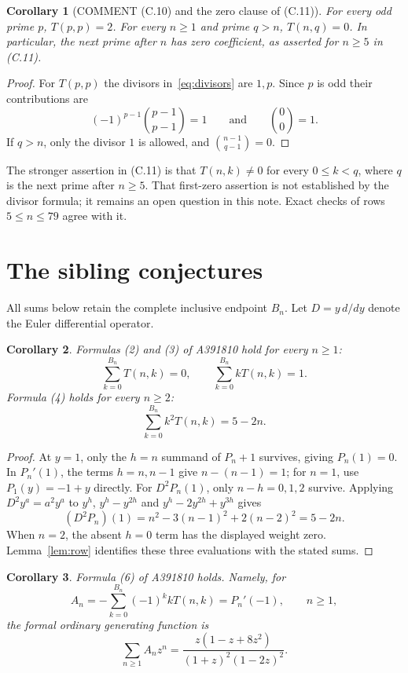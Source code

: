 \documentclass[11pt]{article}
\newtheorem{corollary}{Corollary}
\begin{document}
\begin{corollary}[COMMENT (C.10) and the zero clause of (C.11)]\label{cor:primes}
For every odd prime $p$, $T(p,p)=2$. For every $n\geq1$ and prime
$q>n$, $T(n,q)=0$. In particular, the next prime after $n$ has zero
coefficient, as asserted for $n\geq5$ in (C.11).
\end{corollary}

\begin{proof}
For $T(p,p)$ the divisors in~\eqref{eq:divisors} are $1,p$.
Since $p$ is odd their contributions are
\[
 (-1)^{p-1}\binom{p-1}{p-1}=1
 \qquad\text{and}\qquad \binom00=1.
\]
If $q>n$, only the divisor $1$ is allowed, and
$\binom{n-1}{q-1}=0$.
\end{proof}

The stronger assertion in (C.11) is that $T(n,k)\ne0$ for every
$0\leq k<q$, where $q$ is the next prime after $n\geq5$.
That first-zero assertion is not established by the divisor formula;
it remains an open question in this note. Exact checks of rows $5\leq n\leq79$
agree with it.

\section{The sibling conjectures}

All sums below retain the complete inclusive endpoint $B_n$.
Let $D=y\,d/dy$ denote the Euler differential operator.

\begin{corollary}\label{cor:moments}
Formulas (2) and (3) of A391810 hold for every $n\geq1$:
\[
 \sum_{k=0}^{B_n}T(n,k)=0,\qquad
 \sum_{k=0}^{B_n}kT(n,k)=1.
\]
Formula (4) holds for every $n\geq2$:
\[
 \sum_{k=0}^{B_n}k^2T(n,k)=5-2n.
\]
\end{corollary}

\begin{proof}
At $y=1$, only the $h=n$ summand of $P_n+1$ survives, giving
$P_n(1)=0$. In $P_n'(1)$, the terms $h=n,n-1$ give
$n-(n-1)=1$; for $n=1$, use $P_1(y)=-1+y$ directly.
For $D^2P_n(1)$, only $n-h=0,1,2$ survive. Applying $D^2y^a=a^2y^a$
to $y^h$, $y^h-y^{2h}$ and $y^h-2y^{2h}+y^{3h}$ gives
\[
 (D^2P_n)(1)=n^2-3(n-1)^2+2(n-2)^2=5-2n.
\]
When $n=2$, the absent $h=0$ term has the displayed weight zero.
Lemma~\ref{lem:row} identifies these three evaluations with the stated sums.
\end{proof}

\begin{corollary}\label{cor:alternating-moment}
Formula (6) of A391810 holds. Namely, for
\[
 A_n=-\sum_{k=0}^{B_n}(-1)^k kT(n,k)=P_n'(-1),\qquad n\geq1,
\]
the formal ordinary generating function is
\begin{equation}\label{eq:moment-gf}
 \sum_{n\geq1}A_nz^n
 =\frac{z(1-z+8z^2)}{(1+z)^2(1-2z)^2}.
\end{equation}
\end{corollary}
\end{document}
